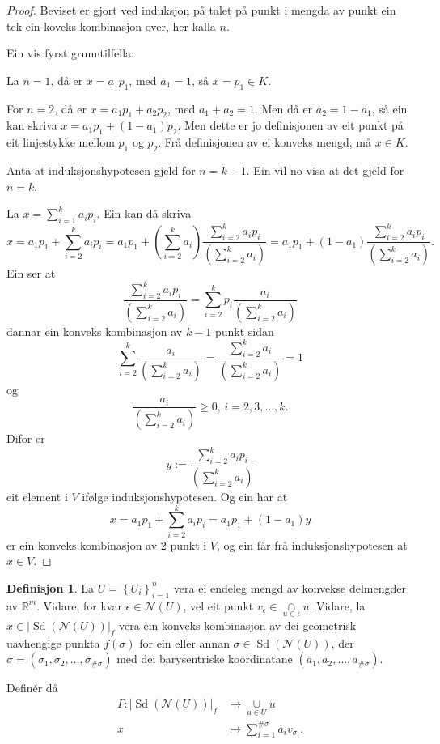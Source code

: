 \documentclass[a4paper, 12pt, norsk]{article}
\theoremstyle{plain}
\theoremstyle{definition}
\newtheorem{definition}[theorem]{Definisjon}
\newcommand{\Rb}{\mathbb{R}}
\newcommand{\Nc}{\mathcal{N}}
\newcommand{\intersect}{ \mathop{\cap}\limits }
\newcommand{\union}{ \mathop{\cup}\limits }
\newcommand{\gr}[1]{ \lvert #1 \rvert } %
\newcommand{\set}[1]{ \left\{ #1 \right\} } %
\newcommand{\tuple}[1]{ \left( #1 \right) } %
\DeclareMathOperator{\Sd}{Sd} %
\begin{document}
\begin{proof}
	Beviset er gjort ved induksjon på talet på punkt i mengda av punkt ein tek ein koveks kombinasjon over, her kalla \( n \).

	Ein vis fyrst grunntilfella:

	La \( n = 1 \), då er \( x = a_1 p_1 \), med \( a_1 = 1 \), så \( x = p_1 \in K \).
	
	For \( n = 2 \), då er \( x = a_1 p_1 + a_2 p_2 \), med \( a_1 + a_2 = 1 \). Men då er \( a_2 = 1 - a_1 \), så ein kan skriva \( x = a_1 p_1 + (1-a_1) p_2 \). Men dette er jo definisjonen av eit punkt på eit linjestykke mellom \( p_1 \) og \( p_2 \). Frå definisjonen av ei konveks mengd, må \( x \in K \).

	Anta at induksjonshypotesen gjeld for \( n = k-1 \). Ein vil no visa at det gjeld for \( n = k \).

	La \( x = \sum_{i=1}^k a_i p_i \). Ein kan då skriva
	\[ 
		x = a_1 p_1 + \sum_{i=2}^k a_i p_i = a_1 p_1 + (\sum_{i=2}^k a_i) \frac{\sum_{i=2}^k a_i p_i}{(\sum_{i=2}^k a_i)} = a_1 p_1 + (1-a_1) \frac{\sum_{i=2}^k a_i p_i}{(\sum_{i=2}^k a_i)}.
	\]
	Ein ser at
	\[
		\frac{\sum_{i=2}^k a_i p_i}{(\sum_{i=2}^k a_i)} = \sum_{i=2}^k p_i\frac{a_i}{(\sum_{i=2}^k a_i)}
	\]
	dannar ein konveks kombinasjon av \( k-1 \) punkt sidan
	\[
		\sum_{i=2}^k \frac{a_i}{(\sum_{i=2}^k a_i)} = \frac{\sum_{i=2}^k a_i}{(\sum_{i=2}^k a_i)} = 1
	\]
	og
	\[
		\frac{a_i}{(\sum_{i=2}^k a_i)} \geq 0, \, i=2,3,\dots,k.
	\]
	Difor er
	\[
		y := \frac{\sum_{i=2}^k a_i p_i}{(\sum_{i=2}^k a_i)}
	\]
	eit element i \( V \) ifølge induksjonshypotesen. Og ein har at
	\[
		x = a_1 p_1 + \sum_{i=2}^k a_i p_i = a_1 p_1 + (1-a_1) y
	\]
	er ein konveks kombinasjon av \( 2 \) punkt i \( V \), og ein får frå induksjonshypotesen at \( x \in V \).
\end{proof}

\begin{definition} \label{thm:Gamma}
	La \( U = \set{U_i}_{i=1}^n \) vera ei endeleg mengd av konvekse delmengder av \( \Rb^m \). Vidare, for kvar \( \epsilon \in \Nc(U) \), vel eit punkt \( v_\epsilon \in \intersect_{u \in \epsilon} u \). Vidare, la \( x \in \gr{\Sd(\Nc(U))}_f \) vera ein konveks kombinasjon av dei geometrisk uavhengige punkta \( f(\sigma) \) for ein eller annan \( \sigma \in \Sd(\Nc(U)) \), der \( \sigma = \tuple{\sigma_1, \sigma_2, \dots, \sigma_{\#\sigma}} \) med dei barysentriske koordinatane \( \tuple{a_1, a_2, \dots, a_{\#\sigma}} \).
	
	Definér då
	\begin{align*}
		\Gamma : \gr{\Sd(\Nc(U))}_f &\to \union_{u \in U} u \\
		x &\mapsto \sum_{i=1}^{\#\sigma} a_i v_{\sigma_i}.
	\end{align*}
\end{definition}
\end{document}
